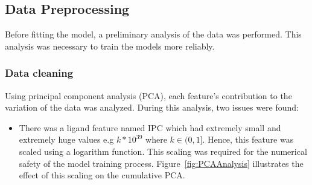 \documentclass[11pt]{article}
\begin{document}
\subsection{Data Preprocessing}
Before fitting the model,  a preliminary analysis of the data was performed.  This analysis was necessary to train the models more reliably.

\subsubsection{Data cleaning}
Using principal component analysis (PCA), each feature's contribution to the variation of the data was analyzed. 
During this analysis, two issues were found:
\begin{itemize}
\item There was a ligand feature named IPC which had extremely small and extremely huge values e.g $k * 10^{39}$ where $k \in (0,1]$.
Hence, this feature was scaled using a logarithm function.
This scaling was required for the numerical safety of the model training process.
Figure~\ref{fig:PCAAnalysis} illustrates the effect of this scaling on the cumulative PCA.


\end{itemize}
\end{document}
